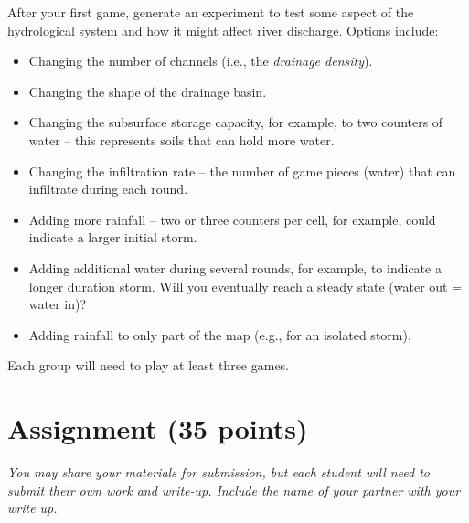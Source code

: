\documentclass[letterpaper,10pt]{amsart}
\begin{document}
After your first game, generate an experiment to test some aspect of the hydrological system and how it might affect river discharge. Options include:
\begin{itemize}
	\small
	\item Changing the number of channels (i.e., the \textit{drainage density}).
	\item Changing the shape of the drainage basin.
	\item Changing the subsurface storage capacity, for example, to two counters of water -- this represents soils that can hold more water.
	\item Changing the infiltration rate -- the number of game pieces (water) that can infiltrate during each round.
	\item Adding more rainfall -- two or three counters per cell, for example, could indicate a larger initial storm.
	\item Adding additional water during several rounds, for example, to indicate a longer duration storm. Will you eventually reach a steady state (water out = water in)?
	\item Adding rainfall to only part of the map (e.g., for an isolated storm).
\end{itemize}
Each group will need to play at least three games.

\section{Assignment (35 points)}

\textit{You may share your materials for submission, but each student will need to submit their own work and write-up. Include the name of your partner with your write up.}
\end{document}
